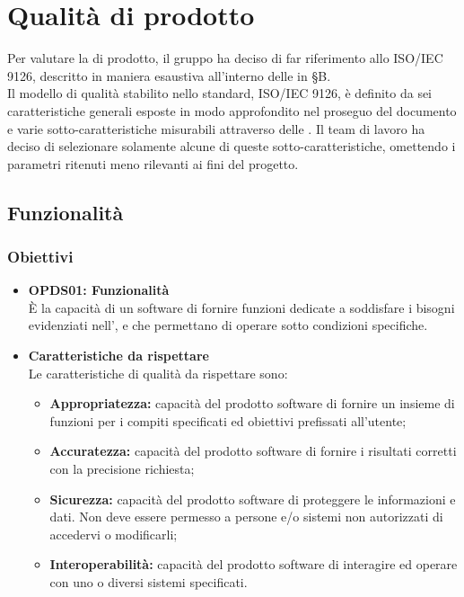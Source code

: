 \section{Qualità di prodotto}
\label{qualità_prodotto}
Per valutare la  di prodotto, il gruppo {\Gruppo} ha deciso di far riferimento allo  ISO/IEC 9126, descritto in maniera esaustiva all'interno delle  in \S{B}.\\
Il modello di qualità stabilito nello standard, ISO/IEC 9126, è definito da sei caratteristiche generali esposte in modo approfondito nel proseguo del documento e varie sotto-caratteristiche misurabili attraverso delle . Il team di lavoro ha deciso di selezionare solamente alcune di queste sotto-caratteristiche, omettendo i parametri ritenuti meno rilevanti ai fini del progetto.
\subsection{Funzionalità}
\subsubsection{Obiettivi}
\begin{itemize}
	\item \textbf{OPDS01: Funzionalità}\\
	È la capacità di un software di fornire funzioni dedicate a soddisfare i bisogni evidenziati nell'\AdR{}, e che permettano di operare sotto  condizioni specifiche.
	\item \textbf{Caratteristiche da rispettare}\\
	Le caratteristiche di qualità da rispettare sono:
	\begin{itemize}
		\item \textbf{Appropriatezza:} capacità del prodotto software di fornire un insieme di funzioni per i compiti specificati ed obiettivi prefissati all'utente;
		\item \textbf{Accuratezza:} capacità del prodotto software di fornire i risultati corretti con la precisione richiesta;
		\item \textbf{Sicurezza:} capacità del prodotto software di proteggere le informazioni e dati. Non deve essere permesso a persone e/o sistemi non autorizzati di accedervi o modificarli;
		\item \textbf{Interoperabilità:} capacità del prodotto software di interagire ed operare con uno o diversi sistemi specificati.
	\end{itemize}
\end{itemize}
